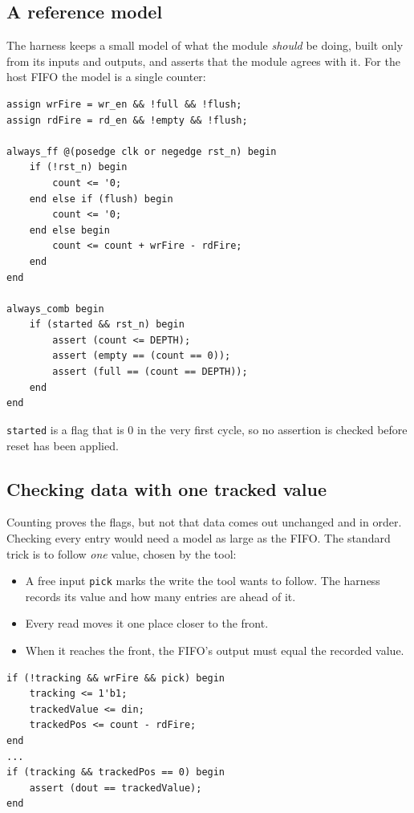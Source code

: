 \documentclass[11pt,a4paper]{article}
\begin{document}
\subsection{A reference model}

The harness keeps a small model of what the module \emph{should} be doing, built only from its inputs and outputs, and asserts that the module agrees with it. For the host FIFO the model is a single counter:

\begin{lstlisting}
assign wrFire = wr_en && !full && !flush;
assign rdFire = rd_en && !empty && !flush;

always_ff @(posedge clk or negedge rst_n) begin
	if (!rst_n) begin
		count <= '0;
	end else if (flush) begin
		count <= '0;
	end else begin
		count <= count + wrFire - rdFire;
	end
end

always_comb begin
	if (started && rst_n) begin
		assert (count <= DEPTH);
		assert (empty == (count == 0));
		assert (full == (count == DEPTH));
	end
end
\end{lstlisting}

\texttt{started} is a flag that is 0 in the very first cycle, so no assertion is checked before reset has been applied.

\subsection{Checking data with one tracked value}

Counting proves the flags, but not that data comes out unchanged and in order. Checking every entry would need a model as large as the FIFO. The standard trick is to follow \emph{one} value, chosen by the tool:

\begin{itemize}
\item A free input \texttt{pick} marks the write the tool wants to follow. The harness records its value and how many entries are ahead of it.
\item Every read moves it one place closer to the front.
\item When it reaches the front, the FIFO's output must equal the recorded value.
\end{itemize}

\begin{lstlisting}
if (!tracking && wrFire && pick) begin
	tracking <= 1'b1;
	trackedValue <= din;
	trackedPos <= count - rdFire;
end
...
if (tracking && trackedPos == 0) begin
	assert (dout == trackedValue);
end
\end{lstlisting}
\end{document}
